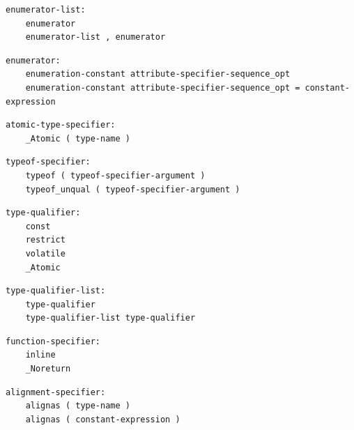 \noindent\textbf{\texttt{}}\par
\begin{lstlisting}
enumerator-list:
    enumerator
    enumerator-list , enumerator
\end{lstlisting}

\noindent\textbf{\texttt{}}\par
\begin{lstlisting}
enumerator:
    enumeration-constant attribute-specifier-sequence_opt
    enumeration-constant attribute-specifier-sequence_opt = constant-expression
\end{lstlisting}

\noindent\textbf{\texttt{}}\par
\begin{lstlisting}
atomic-type-specifier:
    _Atomic ( type-name )
\end{lstlisting}

\noindent\textbf{\texttt{}}\par
\begin{lstlisting}
typeof-specifier:
    typeof ( typeof-specifier-argument )
    typeof_unqual ( typeof-specifier-argument )
\end{lstlisting}

\noindent\textbf{\texttt{}}\par
\begin{lstlisting}
type-qualifier:
    const
    restrict
    volatile
    _Atomic
\end{lstlisting}

\noindent\textbf{\texttt{}}\par
\begin{lstlisting}
type-qualifier-list:
    type-qualifier
    type-qualifier-list type-qualifier
\end{lstlisting}

\noindent\textbf{\texttt{}}\par
\begin{lstlisting}
function-specifier:
    inline
    _Noreturn
\end{lstlisting}

\noindent\textbf{\texttt{}}\par
\begin{lstlisting}
alignment-specifier:
    alignas ( type-name )
    alignas ( constant-expression )
\end{lstlisting}

